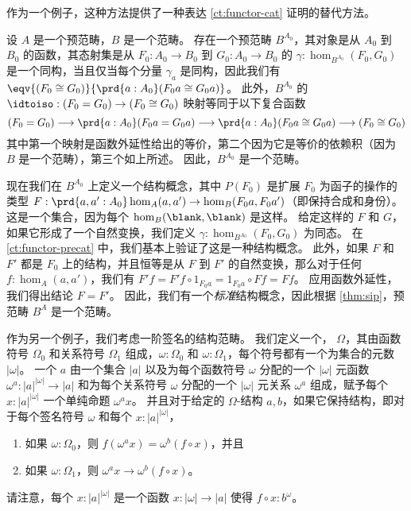 作为一个例子，这种方法提供了一种表达 \cref{ct:functor-cat} 证明的替代方法。

\begin{eg}\label{ct:sip-functor-cat}
设 $A$ 是一个预范畴，$B$ 是一个范畴。
存在一个预范畴 $B^{A_0}$，其对象是从 $A_0$ 到 $B_0$ 的函数，其态射集是从 $F_0:A_0 \to B_0$ 到 $G_0:A_0 \to B_0$ 的 $\gamma:\hom_{B^{A_0}}(F_0, G_0)$ 是一个同构，当且仅当每个分量 $\gamma_a$ 是同构，因此我们有 $\eqv{(F_0 \cong G_0)}{\prd{a:A_0} (F_0 a \cong G_0 a)}$。
此外，$B^{A_0}$ 的 $\idtoiso : (F_0 = G_0) \to (F_0 \cong G_0)$ 映射等同于以下复合函数
\[ (F_0 = G_0) \longrightarrow \prd{a:A_0} (F_0 a  = G_0 a) \longrightarrow \prd{a:A_0} (F_0 a \cong G_0 a) \longrightarrow (F_0 \cong G_0) \]
其中第一个映射是函数外延性给出的等价，第二个因为它是等价的依赖积（因为 $B$ 是一个范畴），第三个如上所述。
因此，$B^{A_0}$ 是一个范畴。

现在我们在 $B^{A_0}$ 上定义一个结构概念，其中 $P(F_0)$ 是扩展 $F_0$ 为函子的操作的类型 $F:\prd{a,a':A_0} \hom_A(a,a') \to \hom_B(F_0 a,F_0 a')$（即保持合成和身份）。
这是一个集合，因为每个 $\hom_B(\blank,\blank)$ 是这样。
给定这样的 $F$ 和 $G$，如果它形成了一个自然变换，我们定义 $\gamma:\hom_{B^{A_0}}(F_0, G_0)$ 为同态。
在 \cref{ct:functor-precat} 中，我们基本上验证了这是一种结构概念。
此外，如果 $F$ 和 $F'$ 都是 $F_0$ 上的结构，并且恒等是从 $F$ 到 $F'$ 的自然变换，那么对于任何 $f:\hom_A(a,a')$，我们有 $F'f = F'f \circ 1_{F_0 a} = 1_{F_0 a}\circ F f = F f$。
应用函数外延性，我们得出结论 $F = F'$。
因此，我们有一个\emph{标准}结构概念，因此根据 \cref{thm:sip}，预范畴 $B^A$ 是一个范畴。
\end{eg}

作为另一个例子，我们考虑一阶签名的结构范畴。
我们定义一个，
%
%
$\Omega$，其由函数符号 $\Omega_0$ 和关系符号 $\Omega_1$ 组成，$\omega:\Omega_0$ 和 $\omega:\Omega_1$，每个符号都有一个为集合的元数 $|\omega|$。
一个%
%
%
$a$ 由一个集合 $|a|$ 以及为每个函数符号 $\omega$ 分配的一个 $|\omega|$ 元函数 $\omega^a:|a|^{|\omega|}\to |a|$ 和为每个关系符号 $\omega$ 分配的一个 $|\omega|$ 元关系 $\omega^a$ 组成，赋予每个 $x:|a|^{|\omega|}$ 一个单纯命题 $\omega^ax$。
并且对于给定的 $\Omega$-结构 $a,b$，如果它保持结构，即对于每个签名符号 $\omega$ 和每个 $x:|a|^{|\omega|}$，
\begin{enumerate}
  \item 如果 $\omega:\Omega_0$，则 $f(\omega^ax) = \omega^b(f\circ x)$，并且
  \item 如果 $\omega:\Omega_1$，则 $\omega^ax\to\omega^b(f\circ x)$。
\end{enumerate}
请注意，每个 $x:|a|^{|\omega|}$ 是一个函数 $x:|\omega|\to |a|$ 使得 $f\circ x : b^\omega$。

